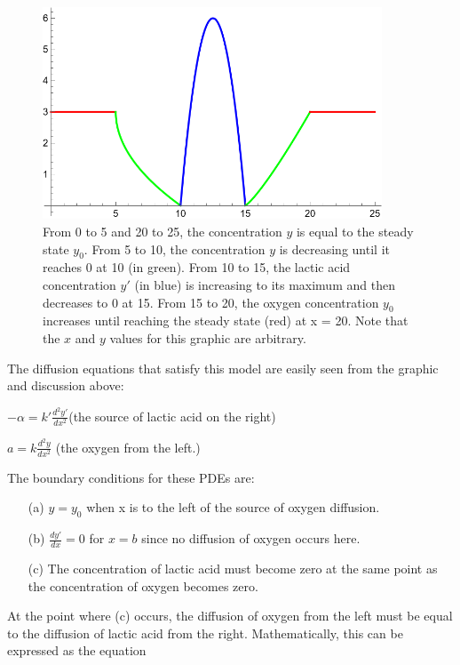 \documentclass{article}
\begin{document}
\begin{figure}[h!]
    \centering
    \includegraphics[width=0.9\textwidth]{graphics/image.png}
    \caption{From 0 to 5 and 20 to 25, the concentration $y$ is equal to the steady state $y_0$. From 5 to 10,
        the concentration $y$ is decreasing until it reaches 0 at 10 (in green). From 10 to 15, the lactic acid concentration
        $y'$ (in blue) is increasing to its maximum and then decreases to 0 at 15. From 15 to 20, the oxygen concentration $y_0$ increases
        until reaching the steady state (red) at x = 20. Note that the $x$ and $y$ values for this graphic are arbitrary.}
    \label{fig:image}
\end{figure}

The diffusion equations that satisfy this model are easily seen from the graphic and discussion above:

$-\alpha = k' \frac{d^2y'}{dx^2} $(the source of lactic acid on the right)

$a = k \frac{d^2y}{dx^2}$ (the oxygen from the left.)

\vspace*{0.25cm}
The boundary conditions for these PDEs are:
\begin{enumerate}
    \item[(a)] $y = y_0$ when x is to the left of the source of oxygen diffusion.
    \item[(b)] $\frac{dy'}{dx} = 0$ for $x = b$ since no diffusion of oxygen occurs here.
    \item[(c)] The concentration of lactic acid must become zero at the same point as the concentration of oxygen becomes zero.
\end{enumerate}

At the point where (c) occurs, the diffusion of oxygen from the left must be equal to the diffusion of lactic acid from the right.
Mathematically, this can be expressed as the equation
\end{document}
